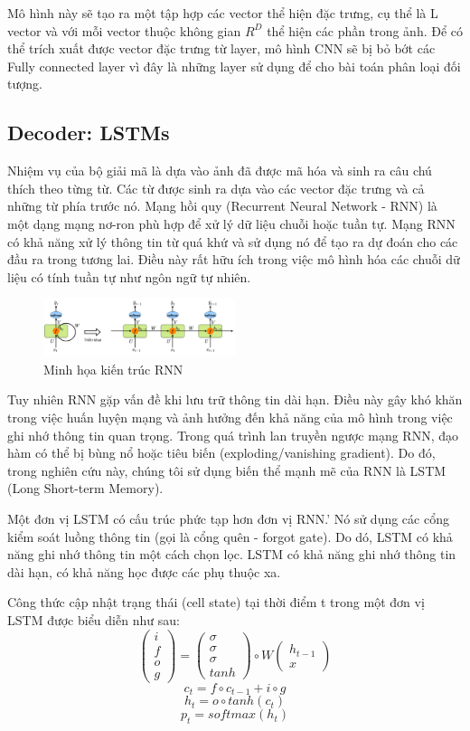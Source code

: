 \documentclass[conference]{IEEEtran}
\begin{document}
Mô hình này sẽ tạo ra một tập hợp các vector thể hiện đặc trưng, cụ thể là L vector và với mỗi vector thuộc không gian $R^D$ thể hiện các phần trong ảnh. Để có thể trích xuất được vector đặc trưng từ layer, mô hình CNN sẽ bị bỏ bớt các Fully connected layer vì đây là những layer sử dụng để cho bài toán phân loại đối tượng. 


\subsection{Decoder: LSTMs}
Nhiệm vụ của bộ giải mã là dựa vào ảnh đã được mã hóa và sinh ra câu chú thích theo từng từ.
Các từ được sinh ra dựa vào các vector đặc trưng và cả những từ phía trước nó.
Mạng hồi quy (Recurrent Neural Network - RNN) là một dạng mạng nơ-ron phù hợp để xử lý dữ liệu chuỗi hoặc tuần tự.
Mạng RNN có khả năng xử lý thông tin từ quá khứ và sử dụng nó để tạo ra dự đoán cho các đầu ra trong tương lai.
Điều này rất hữu ích trong việc mô hình hóa các chuỗi dữ liệu có tính tuần tự như ngôn ngữ tự nhiên.

\begin{figure}[h]
\includegraphics[width=0.5\textwidth]{assets/RNN_model.png}
  \caption{Minh họa kiến trúc RNN}
  \label{fig:RNN_architecture}
\end{figure}

Tuy nhiên RNN gặp vấn đề khi lưu trữ thông tin dài hạn.
Điều này gây khó khăn trong việc huấn luyện mạng và ảnh hưởng đến khả năng của mô hình trong việc ghi nhớ thông tin quan trọng.
Trong quá trình lan truyền ngược mạng RNN, đạo hàm có thể bị bùng nổ hoặc tiêu biến (exploding/vanishing gradient).
Do đó, trong nghiên cứu này, chúng tôi sử dụng biến thể mạnh mẽ của RNN là LSTM\cite{hochreiter1997long} (Long Short-term Memory).

Một đơn vị LSTM có cấu trúc phức tạp hơn đơn vị RNN.'
Nó sử dụng các cổng kiểm soát luồng thông tin (gọi là cổng quên - forgot gate).
Do dó, LSTM có khả năng ghi nhớ thông tin một cách chọn lọc.
LSTM có khả năng ghi nhớ thông tin dài hạn, có khả năng học được các phụ thuộc xa.

Công thức cập nhật trạng thái (cell state) tại thời điểm t trong một đơn vị LSTM được biểu diễn như sau:
$$
\begin{pmatrix}
i \\
f \\
o \\
g
\end{pmatrix}
= 
\begin{pmatrix}
\sigma \\
\sigma \\
\sigma \\
tanh
\end{pmatrix}
\circ
W
\begin{pmatrix}
h_{t-1} \\
x
\end{pmatrix}
$$
$$
c_t = f\circ c_{t-1} + i\circ g
$$
$$
h_t = o \circ tanh(c_t)
$$
$$
p_t = softmax(h_t)
$$
\end{document}
